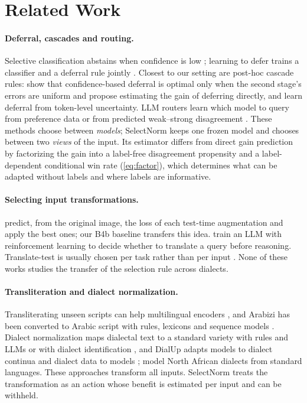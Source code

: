 \section{Related Work}
\label{sec:related}

\paragraph{Deferral, cascades and routing.}
Selective classification abstains when confidence is low \citep{geifman2017selective,geifman2019selectivenet}; learning to defer trains a classifier and a deferral rule jointly \citep{mozannar2020defer}. Closest to our setting are post-hoc cascade rules: \citet{jitkrittum2023cascade} show that confidence-based deferral is optimal only when the second stage's errors are uniform and propose estimating the gain of deferring directly, and \citet{gupta2024cascades} learn deferral from token-level uncertainty. LLM routers learn which model to query from preference data \citep{ong2025routellm} or from predicted weak--strong disagreement \citep{noorani2026disagreement}. These methods choose between \emph{models}; SelectNorm keeps one frozen model and chooses between two \emph{views} of the input. Its estimator differs from direct gain prediction by factorizing the gain into a label-free disagreement propensity and a label-dependent conditional win rate (\cref{eq:factor}), which determines what can be adapted without labels and where labels are informative.

\paragraph{Selecting input transformations.}
\citet{kim2020learningloss} predict, from the original image, the loss of each test-time augmentation and apply the best ones; our B4b baseline transfers this idea. \citet{kang2026luar} train an LLM with reinforcement learning to decide whether to translate a query before reasoning. Translate-test is usually chosen per task rather than per input \citep{artetxe2023revisiting}. None of these works studies the transfer of the selection rule across dialects.

\paragraph{Transliteration and dialect normalization.}
Transliterating unseen scripts can help multilingual encoders \citep{muller2021unseen,moosa2023transliteration}, and Arabizi has been converted to Arabic script with rules, lexicons and sequence models \citep{darwish2014arabizi,shazal2020unified}. Dialect normalization maps dialectal text to a standard variety with rules and LLMs \citep{dimakis2025dialect} or with dialect identification \citep{alhafni2024exploiting}, and DialUp adapts models to dialect continua and dialect data to models \citep{bafna2025dialup}; \citet{toughrai2025modeling} model North African dialects from standard languages. These approaches transform all inputs. SelectNorm treats the transformation as an action whose benefit is estimated per input and can be withheld.

